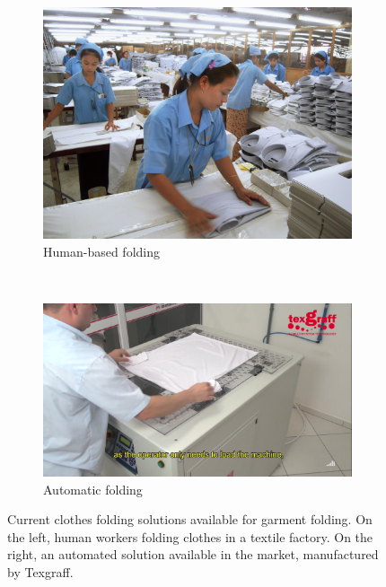 \begin{figure}[htbp]
		\centering
        \begin{subfigure}[l]{0.42\textwidth}
            \centering
    		\includegraphics[width=\textwidth]
    		{figures/Intro_japan_folding.jpg}
			\caption{Human-based folding} %
        \end{subfigure}
        ~
        \begin{subfigure}[r]{0.56\textwidth}
	        \centering
    		\includegraphics[width=\textwidth]
    		{figures/Intro_industrial_folding.png}
		    \caption{Automatic folding}        
		\end{subfigure} 
		\caption[dummy]{Current clothes folding solutions available for garment folding. On the left, human workers folding clothes in a textile factory\footnotemark. On the right, an automated solution available in the market, manufactured by Texgraff\textcopyright.}
		\label{fig:current_solutions}
\end{figure}



